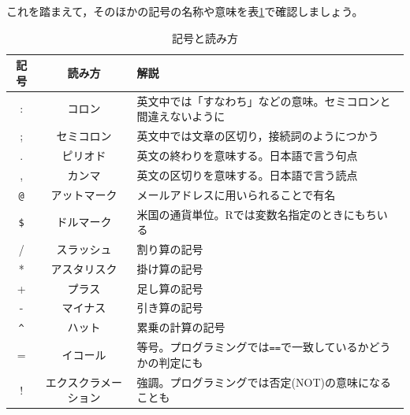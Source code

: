\documentclass{ltjsbook}
\begin{document}
これを踏まえて，そのほかの記号の名称や意味を表\ref{tbl:02_01}で確認しましょう。
\begin{table}[ht]
	\centering
	\caption{記号と読み方}
	\label{tbl:02_01}
	\begin{tabular}{ccl}
		記号        & 読み方            & 解説                                                                         \\\hline
		:         & コロン            & 英文中では「すなわち」などの意味。セミコロンと間違えないように                                            \\
		;         & セミコロン          & 英文中では文章の区切り，接続詞のようにつかう                                                     \\
		.         & ピリオド           & 英文の終わりを意味する。日本語で言う句点                                                       \\
		,         & カンマ            & 英文の区切りを意味する。日本語で言う読点                                                       \\
		\verb|@|  & アットマーク         & メールアドレスに用いられることで有名                                                         \\
		\verb|$|  & ドルマーク          & 米国の通貨単位。Rでは変数名指定のときにもちいる                                                   \\
		/         & スラッシュ          & 割り算の記号                                                                     \\
		*         & アスタリスク         & 掛け算の記号                                                                     \\
		+         & プラス            & 足し算の記号                                                                     \\
		-         & マイナス           & 引き算の記号                                                                     \\
		\verb|^|  & ハット            & 累乗の計算の記号                                                                   \\
		=         & イコール           & 等号。プログラミングでは\verb|==|で一致しているかどうかの判定にも                                      \\
		!         & エクスクラメーション     & 強調。プログラミングでは否定(NOT)の意味になることも                                               \\

\end{tabular}
\end{table}
\end{document}
